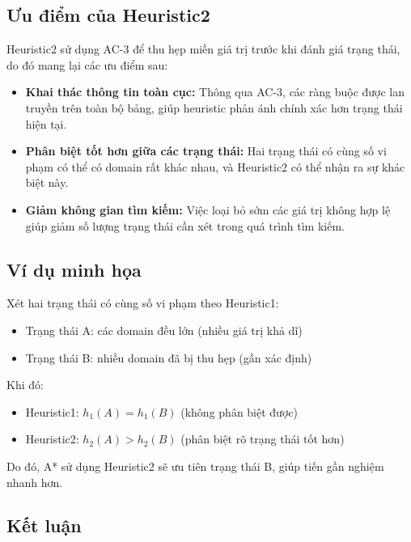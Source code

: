 \subsection{Ưu điểm của Heuristic2}

Heuristic2 sử dụng AC-3 để thu hẹp miền giá trị trước khi đánh giá trạng thái, do đó mang lại các ưu điểm sau:

\begin{itemize}
    \item \textbf{Khai thác thông tin toàn cục:} Thông qua AC-3, các ràng buộc được lan truyền trên toàn bộ bảng, giúp heuristic phản ánh chính xác hơn trạng thái hiện tại.
    
    \item \textbf{Phân biệt tốt hơn giữa các trạng thái:} Hai trạng thái có cùng số vi phạm có thể có domain rất khác nhau, và Heuristic2 có thể nhận ra sự khác biệt này.
    
    \item \textbf{Giảm không gian tìm kiếm:} Việc loại bỏ sớm các giá trị không hợp lệ giúp giảm số lượng trạng thái cần xét trong quá trình tìm kiếm.
\end{itemize}

\subsection{Ví dụ minh họa}

Xét hai trạng thái có cùng số vi phạm theo Heuristic1:

\begin{itemize}
    \item Trạng thái A: các domain đều lớn (nhiều giá trị khả dĩ)
    \item Trạng thái B: nhiều domain đã bị thu hẹp (gần xác định)
\end{itemize}

Khi đó:
\begin{itemize}
    \item Heuristic1: $h_1(A) = h_1(B)$ (không phân biệt được)
    \item Heuristic2: $h_2(A) > h_2(B)$ (phân biệt rõ trạng thái tốt hơn)
\end{itemize}

Do đó, A* sử dụng Heuristic2 sẽ ưu tiên trạng thái B, giúp tiến gần nghiệm nhanh hơn.

\subsection{Kết luận}

